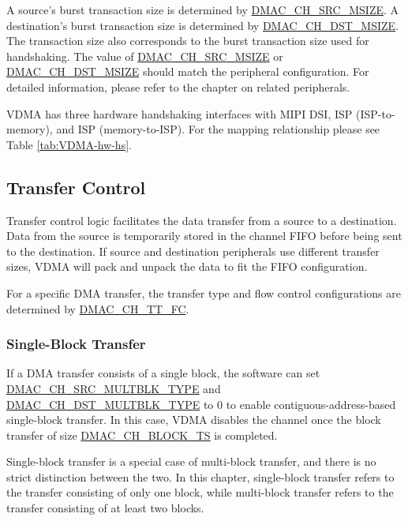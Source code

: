 \documentclass[main\_\_EN.tex]{subfiles}
\begin{document}
A source's burst transaction size is determined by \hyperref[fielddesc:DMACCHNSRCMSIZE]{DMAC\_CH\_SRC\_MSIZE}. A destination's burst transaction size is determined by \hyperref[fielddesc:DMACCHNDSTMSIZE]{DMAC\_CH\_DST\_MSIZE}. The transaction size also corresponds to the burst transaction size used for handshaking. The value of \hyperref[fielddesc:DMACCHNSRCMSIZE]{DMAC\_CH\_SRC\_MSIZE} or \hyperref[fielddesc:DMACCHNDSTMSIZE]{DMAC\_CH\_DST\_MSIZE} should match the peripheral configuration. For detailed information, please refer to the chapter on related peripherals.

VDMA has three hardware handshaking interfaces with MIPI DSI, ISP (ISP-to-memory), and ISP (memory-to-ISP). For the mapping relationship please see Table \ref{tab:VDMA-hw-hs}.

\subsection{Transfer Control}

Transfer control logic facilitates the data transfer from a source to a destination. Data from the source is temporarily stored in the channel FIFO before being sent to the destination. If source and destination peripherals use different transfer sizes, VDMA will pack and unpack the data to fit the FIFO configuration.

For a specific DMA transfer, the transfer type and flow control configurations are determined by \hyperref[fielddesc:DMACCHNTTFC]{DMAC\_CH\_TT\_FC}.

\subsubsection{Single-Block Transfer}

If a DMA transfer consists of a single block, the software can set \hyperref[fielddesc:DMACCHNSRCMULTBLKTYPE]{DMAC\_CH\_SRC\_MULTBLK\_TYPE} and \hyperref[fielddesc:DMACCHNDSTMULTBLKTYPE]{DMAC\_CH\_DST\_MULTBLK\_TYPE} to 0 to enable contiguous-address-based single-block transfer. In this case, VDMA disables the channel once the block transfer of size \hyperref[fielddesc:DMACCHNBLOCKTS]{DMAC\_CH\_BLOCK\_TS} is completed.

\begin{tiplisting}
    Single-block transfer is a special case of multi-block transfer, and there is no strict distinction between the two. In this chapter, single-block transfer refers to the transfer consisting of only one block, while multi-block transfer refers to the transfer consisting of at least two blocks.
\end{tiplisting}
\end{document}
